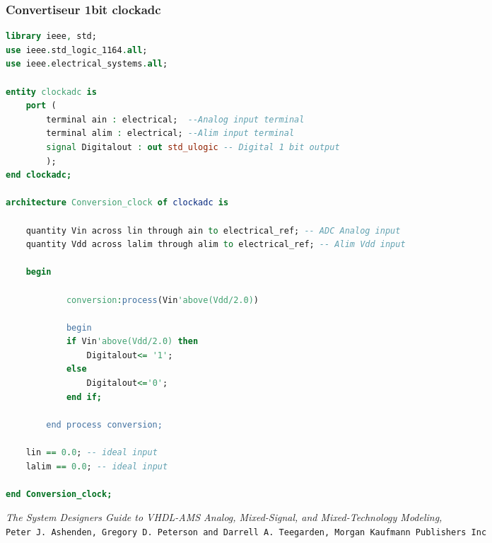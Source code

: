 \documentclass[a4paper]{article}
\begin{document}
\subsubsection{Convertiseur 1bit clockadc}

\begin{lstlisting}[language=VHDL, belowskip=-0.5 \baselineskip]
library ieee, std;
use ieee.std_logic_1164.all;
use ieee.electrical_systems.all;

entity clockadc is
	port (
		terminal ain : electrical;  --Analog input terminal
		terminal alim : electrical; --Alim input terminal
		signal Digitalout : out std_ulogic -- Digital 1 bit output
		);
end clockadc;

architecture Conversion_clock of clockadc is

	quantity Vin across lin through ain to electrical_ref; -- ADC Analog input
	quantity Vdd across lalim through alim to electrical_ref; -- Alim Vdd input

	begin

			conversion:process(Vin'above(Vdd/2.0))

			begin
			if Vin'above(Vdd/2.0) then
				Digitalout<= '1';
			else
				Digitalout<='0';
			end if;

		end process conversion;

	lin == 0.0; -- ideal input
	lalim == 0.0; -- ideal input

end Conversion_clock;
\end{lstlisting}



\clearpage


\clearpage
{}

\begin{thebibliography}{9}

\textit{The System Designers Guide to VHDL-AMS Analog, Mixed-Signal, and Mixed-Technology Modeling,}\\
\texttt{Peter J. Ashenden, Gregory D. Peterson and Darrell A. Teegarden, Morgan Kaufmann Publishers Inc}

\end{thebibliography}
\end{document}
